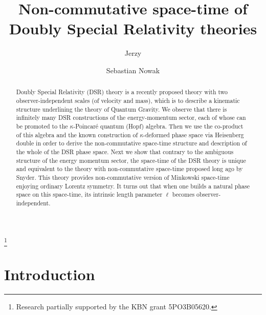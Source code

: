 \documentclass [prd,twocolumn,nofootinbib,showpacs]  {revtex4}
\begin{document}
\title{%
Non-commutative space-time of Doubly Special Relativity theories }
\author{ Jerzy }
\thanks{Research  partially supported
by the    KBN grant 5PO3B05620.}
\author{Sebastian Nowak}


\begin{abstract}
Doubly Special Relativity (DSR) theory is a recently proposed
theory with two observer-independent scales (of velocity and
mass), which is to  describe a kinematic structure underlining the
theory of Quantum  Gravity.  We  observe that there is infinitely
many  DSR constructions of the energy-momentum sector, each of
whose can be promoted to the $\kappa$-Poincar\'e quantum (Hopf)
algebra. Then we use the co-product of this algebra and the known
construction of $\kappa$-deformed phase space via Heisenberg
double  in order to derive the non-commutative space-time
structure and description of the whole of the DSR phase space.
Next we show that contrary to the ambiguous structure of the
energy momentum sector, the space-time of the DSR theory is unique
and equivalent to the theory with non-commutative space-time
proposed long ago by Snyder. This theory provides non-commutative
version of Minkowski space-time enjoying ordinary Lorentz
symmetry.  It turns out that when one builds a natural phase space
on this space-time, its intrinsic length parameter $\ell$ becomes
observer-independent.



\end{abstract}
\maketitle
\section{Introduction}
\end{document}
